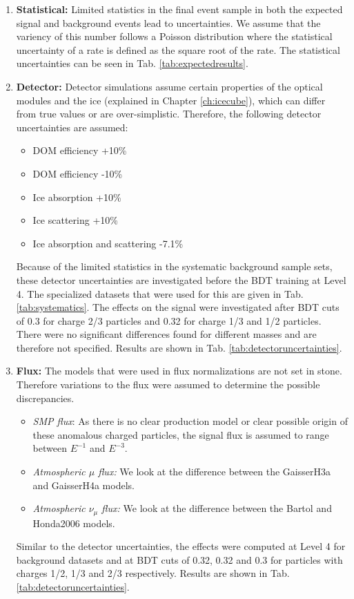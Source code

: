 \begin{enumerate}
\item \textbf{Statistical:} Limited statistics in the final event sample in both the expected signal and background events lead to uncertainties. We assume that the variency of this number follows a Poisson distribution where the statistical uncertainty of a rate is defined as the square root of the rate. The statistical uncertainties can be seen in Tab. \ref{tab:expectedresults}.
\item \textbf{Detector: } Detector simulations assume certain properties of the optical modules and the ice (explained in Chapter \ref{ch:icecube}), which can differ from true values or are over-simplistic. Therefore, the following detector uncertainties are assumed:
\begin{itemize}
\item DOM efficiency +10\%
\item DOM efficiency -10\%
\item Ice absorption +10\%
\item Ice scattering +10\%
\item Ice absorption and scattering -7.1\%
\end{itemize}
Because of the limited statistics in the systematic background sample sets, these detector uncertainties are investigated before the BDT training at Level 4. The specialized datasets that were used for this are given in Tab. \ref{tab:systematics}. The effects on the signal were investigated after BDT cuts of 0.3 for charge 2/3 particles and 0.32 for charge 1/3 and 1/2 particles. There were no significant differences found for different masses and are therefore not specified. Results are shown in Tab. \ref{tab:detectoruncertainties}.
\item \textbf{Flux: }The models that were used in flux normalizations are not set in stone. Therefore variations to the flux were assumed to determine the possible discrepancies.
\begin{itemize}
\item \textit{SMP flux}: As there is no clear production model or clear possible origin of these anomalous charged particles, the signal flux is assumed to range between $E^{-1}$ and $E^{-3}$. 
\item \textit{Atmospheric $\mu$ flux: }We look at the difference between the GaisserH3a \cite{Gaisser:2013bla} and GaisserH4a \cite{Gaisser:2011cc} models.
\item \textit{Atmospheric $\nu_\mu$ flux: }We look at the difference between the Bartol \cite{PhysRevD.70.023006} and Honda2006 \cite{Honda:2006qj} models.
\end{itemize}
Similar to the detector uncertainties, the effects were computed at Level 4 for background datasets and at BDT cuts of 0.32, 0.32 and 0.3 for particles with charges 1/2, 1/3 and 2/3 respectively. Results are shown in Tab. \ref{tab:detectoruncertainties}.


\end{enumerate}
